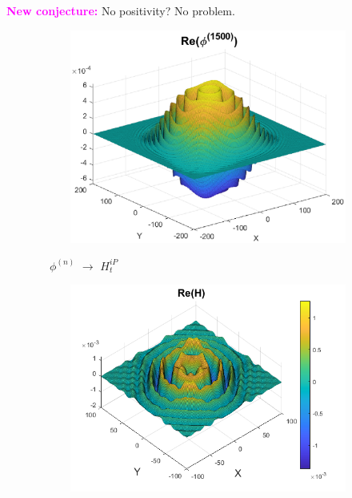 \documentclass{beamer}
\theoremstyle{definition}
\begin{document}
\begin{frame}
\pause

\textbf{\textcolor{magenta}{New conjecture:}} No positivity? No problem.

\begin{figure}
	\vspace{-10pt}
	\begin{subfigure}{0.35\textwidth}
		\centering
		\includegraphics[width=\textwidth]{Real_1500.eps}
	\end{subfigure}
$\quad$$\phi^{(n)}$ $\to$ $H^{iP}_t$$\quad$
	\begin{subfigure}{0.35\textwidth}
		\centering
		\includegraphics[width=\textwidth, trim={0 0 2.5cm 0},clip]{H_ex0.png}
	\end{subfigure}
\end{figure}
\end{frame}
\end{document}
